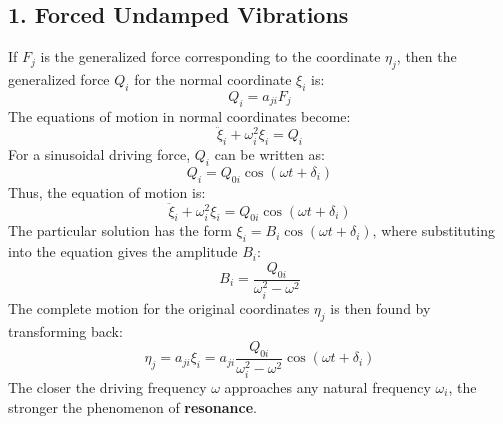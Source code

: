 \documentclass[12pt]{article}
\begin{document}
	\subsection*{1. Forced Undamped Vibrations}
	If $F_j$ is the generalized force corresponding to the coordinate $\eta_j$, then the generalized force $Q_i$ for the normal coordinate $\xi_i$ is:
	$$
	Q_i = a_{ji} F_j
	$$
	The equations of motion in normal coordinates become:
	$$
	\ddot{\xi}_i + \omega_i^2 \xi_i = Q_i
	$$
	For a sinusoidal driving force, $Q_i$ can be written as:
	$$
	Q_i = Q_{0i} \cos(\omega t + \delta_i)
	$$
	Thus, the equation of motion is:
	$$
	\ddot{\xi}_i + \omega_i^2 \xi_i = Q_{0i} \cos(\omega t + \delta_i)
	$$
	The particular solution has the form $\xi_i = B_i \cos(\omega t + \delta_i)$, where substituting into the equation gives the amplitude $B_i$:
	$$
	B_i = \frac{Q_{0i}}{\omega_i^2 - \omega^2}
	$$
	The complete motion for the original coordinates $\eta_j$ is then found by transforming back:
	$$
	\eta_j = a_{ji} \xi_i = a_{ji} \frac{Q_{0i}}{\omega_i^2 - \omega^2} \cos(\omega t + \delta_i)
	$$
	The closer the driving frequency $\omega$ approaches any natural frequency $\omega_i$, the stronger the phenomenon of \textbf{resonance}.
	
\end{document}
